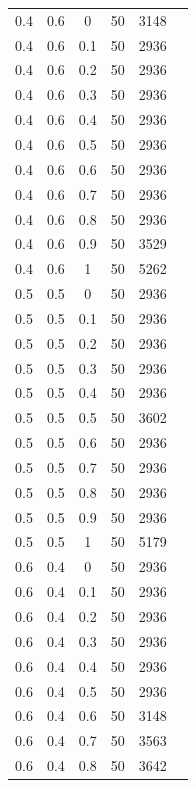 \documentclass[12pt]{report}
\begin{document}
\begin{table}
\begin{minipage}[!h]{0.50\hsize}
\begin{center}
{\begin{tabular}{c@{\hspace{5mm}}c@{\hspace{5mm}}c@{\hspace{5mm}}c@{\hspace{5mm}}c@{\hspace{5mm}}c}
				\midrule
				0.4     &0.6    &0      &50    &3148\\
				0.4     &0.6    &0.1    &50    &2936\\
				0.4     &0.6    &0.2    &50    &2936\\
				0.4     &0.6    &0.3    &50    &2936\\
				0.4     &0.6    &0.4    &50    &2936\\
				0.4     &0.6    &0.5    &50    &2936\\
				0.4     &0.6    &0.6    &50    &2936\\
				0.4     &0.6    &0.7    &50    &2936\\
				0.4     &0.6    &0.8    &50    &2936\\
				0.4     &0.6    &0.9    &50    &3529\\
				0.4     &0.6    &1      &50     &5262\\
				\midrule
				0.5     &0.5    &0      &50    &2936\\
				0.5     &0.5    &0.1    &50    &2936\\
				0.5     &0.5    &0.2    &50    &2936\\
				0.5     &0.5    &0.3    &50    &2936\\
				0.5     &0.5    &0.4    &50    &2936\\
				0.5     &0.5    &0.5    &50    &3602\\
				0.5     &0.5    &0.6    &50    &2936\\
				0.5     &0.5    &0.7    &50    &2936\\
				0.5     &0.5    &0.8    &50    &2936\\
				0.5     &0.5    &0.9    &50   &2936\\
				0.5     &0.5    &1      &50    &5179\\
				\midrule
				0.6     &0.4    &0      &50    &2936\\
				0.6     &0.4    &0.1    &50    &2936\\
				0.6     &0.4    &0.2    &50    &2936\\
				0.6     &0.4    &0.3    &50    &2936\\
				0.6     &0.4    &0.4    &50    &2936\\
				0.6     &0.4    &0.5    &50    &2936\\
				0.6     &0.4    &0.6    &50    &3148\\
				0.6     &0.4    &0.7    &50   &3563\\
				0.6     &0.4    &0.8    &50    &3642\\

\end{tabular}}
\end{center}
\end{minipage}
\end{table}
\end{document}
